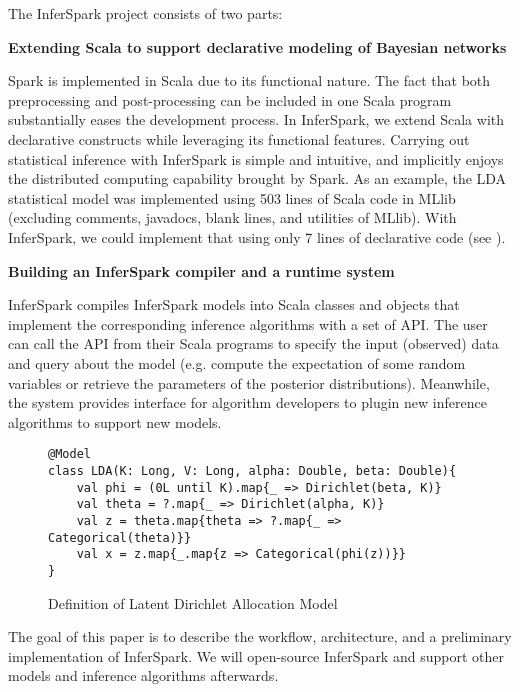 The InferSpark project consists of two parts:
\begin{packed_enum}
	\item {\bf Extending Scala to support declarative modeling of
	Bayesian networks}

	Spark is implemented in Scala due to its functional nature.
The fact that both preprocessing and post-processing can be 
included in one Scala program substantially eases the development process.
	In InferSpark, we extend Scala with declarative constructs 
	while leveraging its functional features.  
	Carrying out statistical inference with InferSpark
	is simple and intuitive, and implicitly enjoys the distributed computing
	capability brought by Spark.  As an example, the LDA statistical model 
	was implemented using 503 lines of Scala code in MLlib 
	(excluding comments,
	javadocs, blank lines, and utilities of MLlib).  
	With InferSpark, we could implement that using only 7 lines 
	of declarative code (see ). 
	

	\item {\bf Building an InferSpark compiler and a runtime system}
		
	InferSpark compiles InferSpark models into Scala classes
	and objects that implement the corresponding inference algorithms 
	with a set of API. 
	The user can call the API from their Scala programs to 
	specify the input (observed) data and query about the model 
	(e.g. compute the expectation of
	some random variables or retrieve the parameters of the posterior
	distributions). Meanwhile, the system provides interface for
	algorithm developers to plugin new inference algorithms to support
	new models.
		
\end{packed_enum}


\begin{figure}
\begin{lstlisting}
@Model
class LDA(K: Long, V: Long, alpha: Double, beta: Double){
	val phi = (0L until K).map{_ => Dirichlet(beta, K)}
	val theta = ?.map{_ => Dirichlet(alpha, K)}
	val z = theta.map{theta => ?.map{_ => Categorical(theta)}}
	val x = z.map{_.map{z => Categorical(phi(z))}}
}
\end{lstlisting}
\label{fig:intro_lda_def}
\caption{Definition of Latent Dirichlet Allocation Model}
\end{figure}

The goal of this paper is to describe the workflow, architecture, 
and a preliminary implementation of
InferSpark.  We will open-source InferSpark and support other models and
inference algorithms afterwards.  

